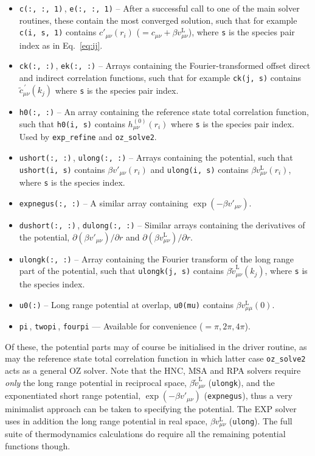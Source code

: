 \documentclass[12pt,a4paper]{article}
\newcommand{\lr}{^{\mathrm{L}}}
\newcommand{\myprime}{^{{}\,\prime}}
\newcommand{\href}{h^{(0)}}
\newcommand{\Eqref}[1]{Eq.~\eqref{#1}}
\begin{document}
\begin{itemize}
%
\item\verb+c(:, :, 1)+\,, \verb+e(:, :, 1)+ -- After a successful
  call to one of the main solver routines, these contain the most
  converged solution, such that for example \verb+c(i, s, 1)+ contains
  $c'_{\mu\nu}(r_i)$ ($=c_{\mu\nu}+\beta v_{\mu\nu}\lr$), where
  \verb+s+ is the species pair index as in \Eqref{eq:ij}.
%
\item\verb+ck(:, :)+\,, \verb+ek(:, :)+ -- Arrays containing the
  Fourier-transformed offset direct and indirect correlation
  functions, such that for example \verb+ck(j, s)+ contains ${\tilde
    c}_{\mu\nu}\myprime(k_j)$ where \verb+s+ is the species pair
  index.
%
\item\verb+h0(:, :)+ -- An array containing the reference state total
  correlation function, such that \verb+h0(i, s)+ contains
  $\href_{\mu\nu}(r_i)$ where \verb+s+ is the species pair index. Used
  by \verb+exp_refine+ and \verb+oz_solve2+.
%
\item\verb+ushort(:, :)+\,, \verb+ulong(:, :)+ --
  Arrays containing the potential, such that \verb+ushort(i, s)+
  contains $\beta v'_{\mu\nu}(r_i)$ and \verb+ulong(i, s)+ contains
  $\beta v\lr_{\mu\nu}(r_i)$, where \verb+s+ is the species index.
%
\item\verb+expnegus(:, :)+ -- A similar array containing $\exp(-\beta
  v'_{\mu\nu})$.
%
\item\verb+dushort(:, :)+\,, \verb+dulong(:, :)+ -- Similar arrays
  containing the derivatives of the potential, $\partial(\beta
  v'_{\mu\nu})/\partial r$ and $\partial(\beta v\lr_{\mu\nu})/\partial
  r$.
%
\item\verb+ulongk(:, :)+ -- Array containing the Fourier transform of
  the long range part of the potential, such that \verb+ulongk(j, s)+
  contains $\beta{\tilde v}\lr_{\mu\nu}(k_j)$, where \verb+s+ is the
  species index.
%
\item\verb+u0(:)+ -- Long range potential at overlap, 
  \verb+u0(mu)+ contains $\beta v_{\mu\mu}\lr(0)$.
%
\item \verb+pi+\,, \verb+twopi+\,, \verb+fourpi+ --- Available for
  convenience ($=\pi, 2\pi, 4\pi$).
%
\end{itemize}

Of these, the potential parts may of course be initialised in the
driver routine, as may the reference state total correlation function
in which latter case \verb+oz_solve2+ acts as a general OZ solver.
Note that the HNC, MSA and RPA solvers require \emph{only} the long
range potential in reciprocal space, $\beta{\tilde v}\lr_{\mu\nu}$
(\verb+ulongk+), and the exponentiated short range potential,
$\exp(-\beta v'_{\mu\nu})$ (\verb+expnegus+), thus a very minimalist
approach can be taken to specifying the potential.  The EXP solver
uses in addition the long range potential in real space, $\beta
v\lr_{\mu\nu}$ (\verb+ulong+).  The full suite of thermodynamics
calculations do require all the remaining potential functions though.
\end{document}
